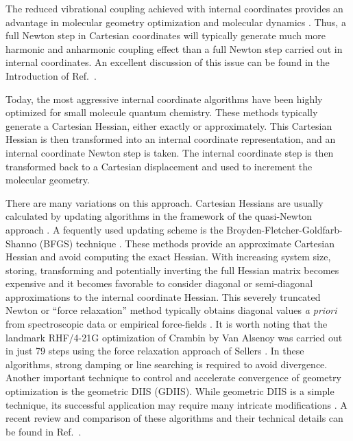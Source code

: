 \documentclass[prl,twocolumn,showpacs,twocolumngrid,superbib]{revtex4}
\begin{document}
The reduced 
vibrational
coupling achieved with internal coordinates provides an advantage 
in molecular geometry optimization \cite{pulay_review} and molecular dynamics \cite{pulay_dynamics}.
Thus, a full Newton step in Cartesian coordinates will typically generate much more harmonic and anharmonic coupling effect
than a full Newton step carried out in internal coordinates.
An excellent discussion of this issue can be found in the Introduction of Ref.~\cite{Pulay_natural_internals}.

Today, the most aggressive internal coordinate algorithms have been highly optimized for 
small molecule quantum chemistry.  These methods typically generate a Cartesian Hessian,
either exactly or approximately. This Cartesian Hessian is then transformed into an internal 
coordinate representation, and an internal coordinate Newton step is taken. The internal 
coordinate step is then transformed back to a Cartesian displacement and used to increment the 
molecular geometry.

There are many variations on this approach.  
Cartesian Hessians are usually calculated by updating algorithms
in the framework of the quasi-Newton approach \cite{RFletcher}.
A fequently used updating scheme is the Broyden-Fletcher-Goldfarb-Shanno (BFGS) technique \cite{RFletcher}. 
These methods provide an approximate Cartesian Hessian and avoid
computing the exact Hessian.
With increasing system size, storing,
transforming and potentially inverting the full Hessian matrix becomes expensive and it becomes
favorable to consider diagonal or semi-diagonal approximations to the internal coordinate Hessian. 
This severely truncated Newton or  ``force relaxation'' method typically obtains diagonal values 
{\em a priori} from spectroscopic data or empirical force-fields 
\cite{pulay_69,pulay_review,sellers,fogarasi_diaghess,Pulay_natural_internals,van_alsenoy_98,lindh}.
It is worth noting that the landmark RHF/4-21G optimization of Crambin by Van Alsenoy \cite{van_alsenoy_98}
was carried out in just 79 steps using the force relaxation approach of Sellers \cite{sellers}.
In these 
algorithms, strong damping \cite{sellers} or line searching \cite{sclegel_linesearch}
is required to avoid divergence. 
Another important technique to control and accelerate convergence of geometry optimization 
is the geometric DIIS \cite{Pulay_GDIIS} (GDIIS). While geometric DIIS is a simple technique, 
its successful application may require many intricate modifications \cite{Farkas_GDIIS}.  A recent 
review and comparison of these algorithms and their technical details can be found in Ref.~\cite{bakken}.  
\end{document}

